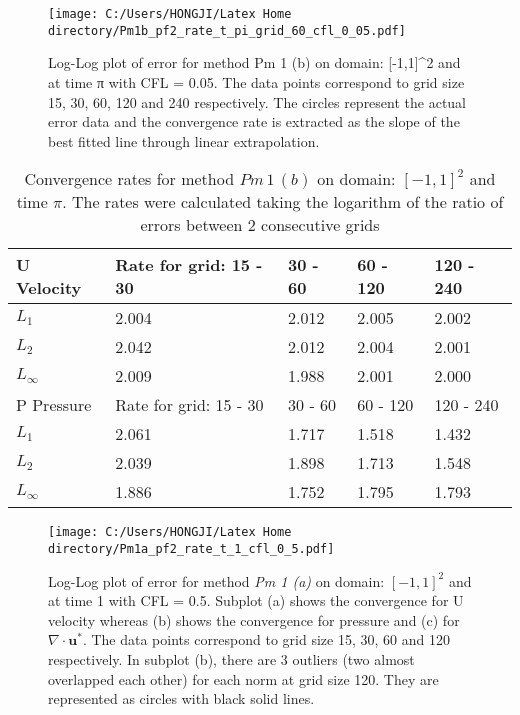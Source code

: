 \begin{figure}[H]
	\centering
	\texttt{[image: C:/Users/HONGJI/Latex Home directory/Pm1b\_pf2\_rate\_t\_pi\_grid\_60\_cfl\_0\_05.pdf]}
	\caption{Log-Log plot of error for method Pm 1 (b) on domain: [-1,1]^2 and at time π with CFL = 0.05. The data points correspond to grid size 15, 30, 60, 120 and 240 respectively. The circles represent the actual error data and the convergence rate is extracted as the slope of the best fitted line through linear extrapolation.}\label{fig:6.2}
\end{figure}

\newpage
\begin{table}	
\centering
\begin{tabular}{|l|l|l|l|l|}
	\hline
	U Velocity & Rate for grid: 15 - 30 & 30 - 60 & 60 - 120 & 120 - 240\\
	\hline
	$L_1$ & 2.004 & 2.012 & 2.005 & 2.002\\
	$L_2$ & 2.042 & 2.012 & 2.004 & 2.001\\
	$L_\infty$ & 2.009 & 1.988 & 2.001 & 2.000\\
	\hline
	P Pressure &  Rate for grid: 15 - 30 & 30 - 60 & 60 - 120 & 120 - 240\\
	\hline
	$L_1$ & 2.061 & 1.717 & 1.518 & 1.432\\
	$L_2$ & 2.039 & 1.898 & 1.713 & 1.548\\
	$L_\infty$ & 1.886 & 1.752 & 1.795 & 1.793\\
	\hline
\end{tabular}
\caption{Convergence rates for method $Pm\,1\,(b)$ on domain: $[-1,1]^2$ and time $\pi$. The rates were calculated taking the logarithm of the ratio of errors between 2 consecutive grids}\label{table:1}
\end{table}


\begin{figure}[H]
	\centering
	\texttt{[image: C:/Users/HONGJI/Latex Home directory/Pm1a\_pf2\_rate\_t\_1\_cfl\_0\_5.pdf]}
	\caption{Log-Log plot of error for method \textit{Pm 1 (a)} on domain: $[-1,1]^2$ and at time 1 with CFL = 0.5. Subplot (a) shows the convergence for U velocity whereas (b) shows the convergence for pressure and (c) for $\nabla \cdot \textbf{u}^*$. The data points correspond to grid size 15, 30, 60 and 120 respectively. In subplot (b), there are 3 outliers (two almost overlapped each other) for each norm at grid size 120. They are represented as circles with black solid lines.}\label{fig:6.4}
\end{figure}

